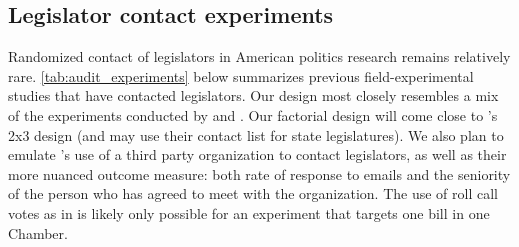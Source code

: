 \documentclass[12pt,final,fleqn]{article}
\theoremstyle{plain}
\begin{document}
\subsection{Legislator contact experiments}  \label{sec: contact experiments}

Randomized contact of legislators in American politics research remains relatively rare. \autoref{tab:audit_experiments} below summarizes previous field-experimental studies that have contacted legislators. Our design most closely resembles a mix of the experiments conducted by \citet{butler2011politicians} and \citet{kalla2016campaign}. Our factorial design will come close to \citet{butler2011politicians}'s 2x3 design (and may use their contact list for state legislatures). We also plan to emulate \citet{kalla2016campaign}'s use of a third party organization to contact legislators, as well as their more nuanced outcome measure: both rate of response to emails and the seniority of the person who has agreed to meet with the organization. The use of roll call votes as in \citet{bergan2009does} is likely only possible for an experiment that targets one bill in one Chamber. 

\end{document}
